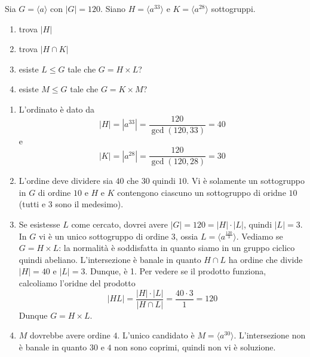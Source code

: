 \documentclass[a4paper]{article}
\begin{document}
\begin{snippetexercise}{}
    Sia \(G = \langle a \rangle\)
    con \(|G| = 120\). Siano \(H = \langle a^{33} \rangle\)
    e \(K = \langle a^{28} \rangle\) sottogruppi.
    \begin{enumerate}
        \item trova \(|H|\)
        \item trova \(|H\cap K|\)
        \item esiste \(L \leq G\) tale che \(G = H \times L\)?
        \item esiste \(M \leq G\) tale che \(G = K \times M\)?
    \end{enumerate}
\end{snippetexercise}

\begin{snippetproof}{}
    \begin{enumerate}
        \item L'ordinato è dato da
        \[
            |H| = |a^{33}| = \frac{120}{\gcd(120, 33)} = 40
        \]
        e
        \[
            |K| = |a^{28}| = \frac{120}{\gcd(120, 28)} = 30
        \]
        \item L'ordine deve dividere sia \(40\) che \(30\) quindi \(10\).
        Vi è solamente un sottogruppo in \(G\) di ordine \(10\)
        e \(H\) e \(K\) contengono ciascuno un sottogruppo di oridne \(10\)
        (tutti e 3 sono il medesimo).
        \item Se esistesse \(L\) come cercato, dovrei avere
        \(|G| = 120 = |H| \cdot |L|\), quindi \(|L| = 3\).
        In \(G\) vi è un unico sottogruppo di ordine \(3\),
        ossia \(L = \langle a^{\frac{120}{3}} \rangle\).
        Vediamo se \(G = H\times L\): la normalità è soddisfatta in quanto siamo in un gruppo ciclico quindi abeliano.
        L'intersezione è banale in quanto \(H \cap L\)
        ha ordine che divide \(|H| = 40\) e \(|L| = 3\).
        Dunque, è 1.
        Per vedere se il prodotto funziona, calcoliamo l'oridne del prodotto
        \[
            |HL| = \frac{|H| \cdot |L|}{|H \cap L|} = \frac{40 \cdot 3}{1} = 120
        \]
        Dunque \(G = H \times L\).
        \item \(M\) dovrebbe avere ordine \(4\).
        L'unico candidato è \(M = \langle a^{30} \rangle\).
        L'intersezione non è banale in quanto \(30\) e \(4\) non sono coprimi,
        quindi non vi è soluzione.
    \end{enumerate}
\end{snippetproof}
\end{document}

